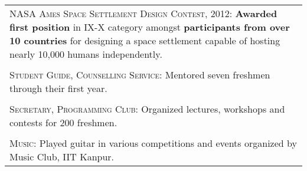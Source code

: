 \documentclass[a4paper,10pt]{article}
\begin{document}
\begin{longtable}{p{16cm}}
\large \textsc{NASA Ames Space Settlement Design Contest, 2012}: \normalsize \textbf{Awarded first position} in IX-X category amongst \textbf{participants from over 10 countries} for designing a space settlement capable of hosting nearly 10,000 humans independently.\\ \\
\large \textsc{Student Guide, Counselling Service}: \normalsize
Mentored seven freshmen through their first year.\\ \\
\large \textsc{Secretary, Programming Club}: \normalsize
Organized lectures, workshops and contests for 200 freshmen.
\\ \\
\large \textsc{Music}: \normalsize
Played guitar in various competitions and events organized by Music Club, IIT Kanpur.
\end{longtable}
\end{document}
